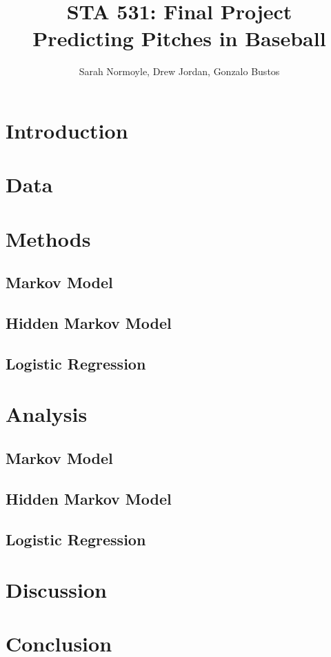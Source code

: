 \documentclass{article}
\begin{document}
\title{STA 531: Final Project \\ Predicting Pitches in Baseball}
\author{Sarah Normoyle, Drew Jordan, Gonzalo Bustos}

\maketitle 

\section{Introduction}


\section{Data}


\section{Methods}

\subsection{Markov Model}

\subsection{Hidden Markov Model}

\subsection{Logistic Regression}

\section{Analysis}

\subsection{Markov Model}

\subsection{Hidden Markov Model}

\subsection{Logistic Regression}

\section{Discussion}


\section{Conclusion}
\end{document}
